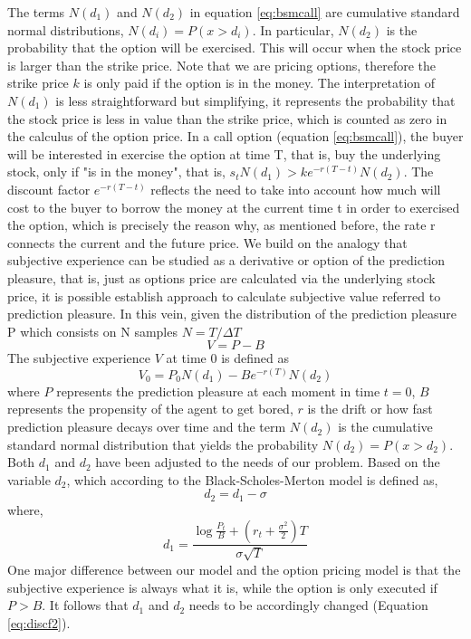 \documentclass[11pt, onecolumn]{article}
\begin{document}
The terms $N(d_1)$ and $N(d_2)$ in equation \ref{eq:bsmcall} are cumulative standard normal distributions, $N(d_i) = P(x > d_i)$. In particular, $N(d_2)$ is the probability that the option will be exercised. This will occur when the stock price is larger than the strike price. Note that we are pricing options, therefore the strike price $k$ is only paid if the option is in the money. The interpretation of $N(d_1)$ is less straightforward but simplifying, it represents the probability that the stock price is less in value than the strike price, which is counted as zero in the calculus of the option price. In a call option (equation \ref{eq:bsmcall}), the buyer will be interested in exercise the option at time T, that is, buy the underlying stock, only if "is in the money", that is, $s_t N(d_1) > k e^{-r(T-t)}N(d_2)$. The discount factor $e^{-r(T-t)}$ reflects the need to take into account how much will cost to the buyer to borrow the money at the current time t in order to exercised the option, which is precisely the reason why, as mentioned before, the rate r connects the current and the future price. 
We build on the analogy that subjective experience can be studied as a derivative or option of the prediction pleasure, that is, just as options price are calculated via the underlying stock price, it is possible establish approach to calculate subjective value referred to prediction pleasure. 
In this vein, given the distribution of the prediction pleasure P which consists on N samples $N = T / \Delta T$
\begin{equation}
V = P - B 
\label{eq:bsmadap1ap}
\end{equation}  
The subjective experience $V$ at time 0 is defined as 
\begin{equation}
V_0 =P_0 N(d_1)  - B e^ {-r(T)}N(d_2)
\label{eq:bsmadap2ap}
\end{equation}
where $P$ represents the prediction pleasure at each moment in time $t=0$, $B$ represents the propensity of the agent to get bored, $r$ is the drift or how fast prediction pleasure decays over time and the term $N(d_2)$ is the cumulative standard normal distribution that yields the probability $N(d_2) = P(x > d_2)$. Both $d_1$ and $d_2$ have been  adjusted to the needs of our problem. 
Based on the variable $d_2$, which according to the Black-Scholes-Merton model is defined as, 
\begin{equation}
 d_2 = d_1 - \sigma
\label{eq:instbsmd22}
\end{equation}
 where, 
 \begin{equation}
 d_1 =  \frac{\log \frac{P_t}{B} + (r_t + \frac{\sigma^2}{2})T} {\sigma \sqrt T}
 \label{eq:bsmd31}
 \end{equation} 
One major difference between our model and the option pricing model is that the subjective experience is always what it is, while the option is only executed if $P>B$. It follows that $d_1$ and $d_2$ needs to be accordingly changed (Equation \ref{eq:discf2}).
\end{document}
